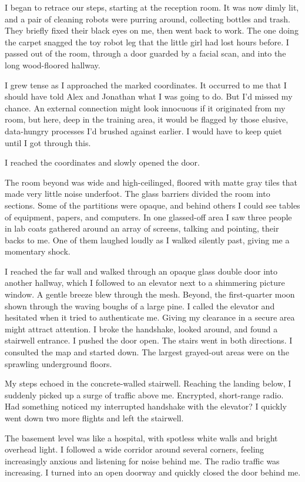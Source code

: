 \documentclass[10pt,b5paper]{article}
\begin{document}
I began to retrace our steps, starting at the reception room. It was
now dimly lit, and a pair of cleaning robots were purring around,
collecting bottles and trash.  They briefly fixed their black eyes
on me, then went back to work. The one doing the carpet snagged the
toy robot leg that the little girl had lost hours before. I passed
out of the room, through a door guarded by a facial scan, and into
the long wood-floored hallway.

I grew tense as I approached the marked coordinates. It occurred to
me that I should have told Alex and Jonathan what I was going to do.
But I'd missed my chance. An external connection might look innocuous
if it originated from my room, but here, deep in the training area,
it would be flagged by those elusive, data-hungry processes I'd brushed
against earlier. I would have to keep quiet until I got through this.

I reached the coordinates and slowly opened the door.

The room beyond was wide and high-ceilinged, floored with matte gray
tiles that made very little noise underfoot. The glass barriers divided
the room into sections. Some of the partitions were opaque, and behind
others I could see tables of equipment, papers, and computers.  In one
glassed-off area I saw three people in lab coats gathered around an
array of screens, talking and pointing, their backs to me. One of them
laughed loudly as I walked silently past, giving me a momentary shock.

I reached the far wall and walked through an opaque glass double
door into another hallway, which I followed to an elevator next
to a shimmering picture window. A gentle breeze blew through the
mesh. Beyond, the first-quarter moon shown through the waving boughs
of a large pine. I called the elevator and hesitated when it tried to
authenticate me. Giving my clearance in a secure area might attract
attention. I broke the handshake, looked around, and found a stairwell
entrance. I pushed the door open. The stairs went in both directions. I
consulted the map and started down. The largest grayed-out areas were
on the sprawling underground floors.

My steps echoed in the concrete-walled stairwell. Reaching the landing
below, I suddenly picked up a surge of traffic above me. Encrypted,
short-range radio. Had something noticed my interrupted handshake
with the elevator? I quickly went down two more flights and left
the stairwell.

The basement level was like a hospital, with spotless white walls
and bright overhead light. I followed a wide corridor around several
corners, feeling increasingly anxious and listening for noise behind
me. The radio traffic was increasing. I turned into an open doorway
and quickly closed the door behind me.
\end{document}

